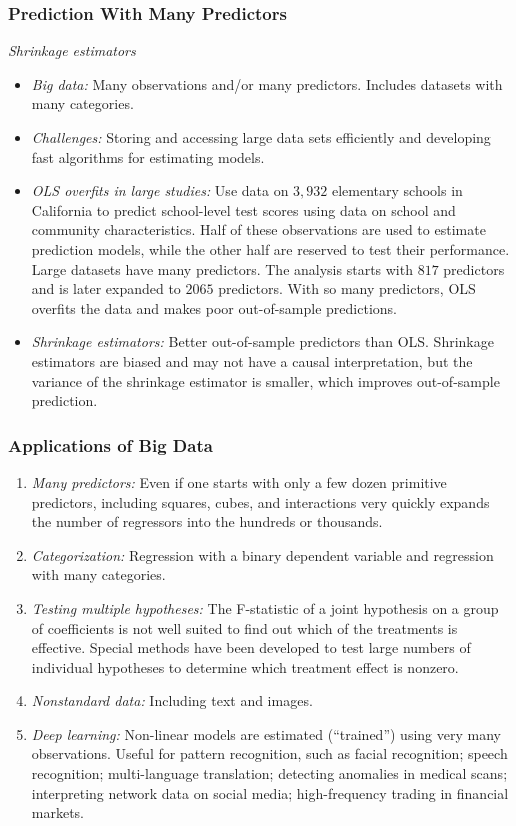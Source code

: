 

\begin{frame}
\frametitle{Prediction With Many Predictors}
\emph{Shrinkage estimators}
\begin{itemize}
\item \emph{Big data:}
Many observations and/or many predictors. Includes datasets with many categories. 
\item \emph{Challenges:} 
Storing and accessing large data sets efficiently and developing fast algorithms for estimating models.
\item \emph{OLS overfits in large studies:} 
Use data on $3,932$ elementary schools in California to predict school-level test scores using data on school and community characteristics. Half of these observations are used to estimate prediction models, while the other half are reserved to test their performance. Large datasets have many predictors. The analysis starts with $817$ predictors and is later expanded to $2065$ predictors. With so many predictors, OLS overfits the data and makes poor out-of-sample predictions.
\item \emph{Shrinkage estimators:} 
Better out-of-sample predictors than OLS. Shrinkage estimators are biased and may not have a causal interpretation, but the variance of the shrinkage estimator is smaller, which improves out-of-sample prediction.
\end{itemize}
\end{frame}


\begin{frame}
\frametitle{Applications of Big Data}
\begin{enumerate}
\item \emph{Many predictors:}
 Even if one starts with only a few dozen primitive predictors, including squares, cubes, and interactions very quickly expands the number of regressors into the hundreds or thousands.
\item \emph{Categorization:}
Regression with a binary dependent variable and regression with many categories. 
\item \emph{Testing multiple hypotheses:}
The F-statistic of a joint hypothesis on a group of coefficients is not well suited to find out which of the treatments is effective. Special methods have been developed to test large numbers of individual hypotheses to determine which treatment effect is nonzero.
\item \emph{Nonstandard data:}
Including text and images. 
\item \emph{Deep learning:}
Non-linear models are estimated (``trained'') using very many observations. Useful for pattern recognition, such as facial recognition; speech recognition; multi-language translation; detecting anomalies in medical scans; interpreting network data on social media; high-frequency trading in financial markets.
\end{enumerate}
\end{frame}
